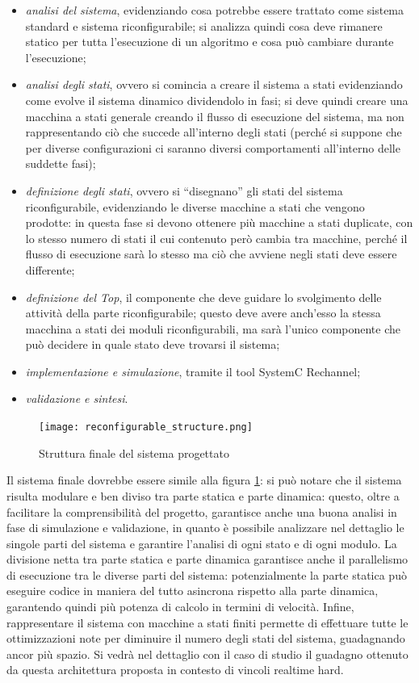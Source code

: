 \documentclass[a4paper,titlepage]{book}
\begin{document}
\begin{itemize}
  \item \textit{analisi del sistema}, evidenziando cosa potrebbe essere trattato come sistema standard e sistema riconfigurabile; si analizza quindi cosa deve rimanere statico per tutta l'esecuzione di un algoritmo e cosa può cambiare durante l'esecuzione;
  \item \textit{analisi degli stati}, ovvero si comincia a creare il sistema a stati evidenziando come evolve il sistema dinamico dividendolo in fasi; si deve quindi creare una macchina a stati generale creando il flusso di esecuzione del sistema, ma non rappresentando ciò che succede all'interno degli stati (perché si suppone che per diverse configurazioni ci saranno diversi comportamenti all'interno delle suddette fasi);
  \item \textit{definizione degli stati}, ovvero si ``disegnano'' gli stati del sistema riconfigurabile, evidenziando le diverse macchine a stati che vengono prodotte: in questa fase si devono ottenere più macchine a stati duplicate, con lo stesso numero di stati il cui contenuto però cambia tra macchine, perché il flusso di esecuzione sarà lo stesso ma ciò che avviene negli stati deve essere differente;
  \item \textit{definizione del Top}, il componente che deve guidare lo svolgimento delle attività della parte riconfigurabile; questo deve avere anch'esso la stessa macchina a stati dei moduli riconfigurabili, ma sarà l'unico componente che può decidere in quale stato deve trovarsi il sistema;
  \item \textit{implementazione e simulazione}, tramite il tool SystemC Rechannel;
  \item \textit{validazione e sintesi}.
\end{itemize}

\begin{figure}[!ht]
\centering
\texttt{[image: reconfigurable\_structure.png]}
\caption{Struttura finale del sistema progettato}\label{fig:6}
\end{figure}

Il sistema finale dovrebbe essere simile alla figura \ref{fig:6}: si può notare che il sistema risulta modulare e ben diviso tra parte statica e parte dinamica: questo, oltre a facilitare la comprensibilità del progetto, garantisce anche una buona analisi in fase di simulazione e validazione, in quanto è possibile analizzare nel dettaglio le singole parti del sistema e garantire l'analisi di ogni stato e di ogni modulo.
La divisione netta tra parte statica e parte dinamica garantisce anche il parallelismo di esecuzione tra le diverse parti del sistema: potenzialmente la parte statica può eseguire codice in maniera del tutto asincrona rispetto alla parte dinamica, garantendo quindi più potenza di calcolo in termini di velocità. Infine, rappresentare il sistema con macchine a stati finiti permette di effettuare tutte le ottimizzazioni note per diminuire il numero degli stati del sistema, guadagnando ancor più spazio.
Si vedrà nel dettaglio con il caso di studio il guadagno ottenuto da questa architettura proposta in contesto di vincoli realtime hard.
\end{document}
